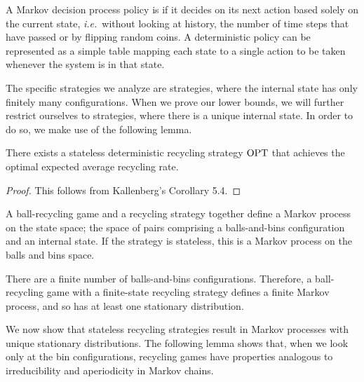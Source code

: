 A Markov decision process policy is  if it decides on its
next action based solely on the current state, \textit{i.e.}\ without looking at
history, the number of time steps that have passed or by flipping random
coins.  A deterministic policy can be represented as a simple table mapping
each state to a single action to be taken whenever the system is in that state.

The specific strategies we analyze are  strategies, where
the internal state has only finitely many configurations.  When we prove our
lower bounds, we will further restrict ourselves to 
strategies, where there is a unique internal state. In order to do so, we make
use of the following lemma.

\begin{lemma}\label{lem:deterministic-opt}
	There exists a stateless deterministic recycling strategy $\mathrm{OPT}$ that
	achieves the optimal expected average recycling rate.
\end{lemma}
\begin{proof}
	This follows from Kallenberg's Corollary 5.4.
\end{proof}


A ball-recycling game and a recycling strategy together define a Markov
process on the state space; the space of pairs comprising a balls-and-bins
configuration and an internal state. If the strategy is stateless, this is a
Markov process on the balls and bins space.

There are a finite number of balls-and-bins configurations. Therefore, a
ball-recycling game with a finite-state recycling strategy defines a finite
Markov process, and so has at least one stationary distribution.

We now show that stateless recycling strategies result in Markov processes with
unique stationary distributions.  The following lemma shows that, when we look
only at the bin configurations, recycling games have properties analogous to
irreducibility and aperiodicity in Markov chains. 


